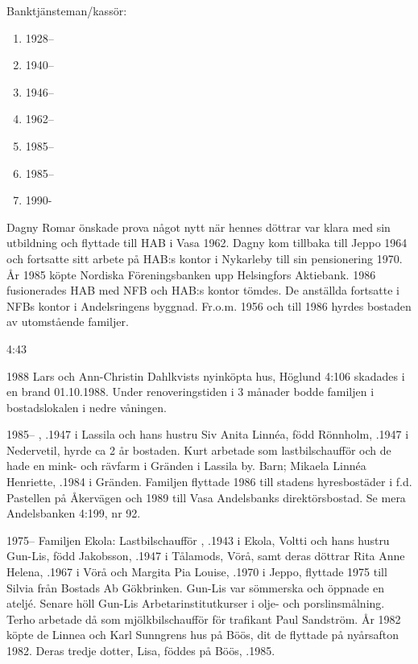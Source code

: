 Banktjänsteman/kassör:
\begin{enumerate}
  \item 1928--  
  \item 1940--  
  \item 1946--	
  \item 1962--  
  \item 1985--  
  \item 1985--	
  \item 1990- 	  
\end{enumerate}

Dagny Romar önskade prova något nytt när hennes döttrar var klara med sin utbildning och flyttade till HAB i Vasa 1962. Dagny kom tillbaka till Jeppo 1964 och fortsatte sitt arbete på HAB:s kontor i Nykarleby till sin pensionering 1970. År 1985 köpte Nordiska Föreningsbanken upp Helsingfors Aktiebank. 1986 fusionerades HAB med NFB och HAB:s kontor tömdes. De anställda fortsatte i NFBs kontor i Andelsringens byggnad. Fr.o.m. 1956 och till 1986 hyrdes bostaden av utomstående familjer.

 4:43

1988
Lars och Ann-Christin Dahlkvists nyinköpta hus, Höglund 4:106 skadades i en brand 01.10.1988. Under renoveringstiden i 3 månader bodde familjen i bostadslokalen i nedre våningen.


1985--
, .1947 i Lassila och hans hustru Siv Anita Linnéa, född Rönnholm, .1947 i Nedervetil, hyrde ca 2 år bostaden. Kurt arbetade som lastbilschaufför och de hade en mink- och rävfarm i Gränden i Lassila by. Barn; Mikaela Linnéa Henriette, .1984 i Gränden. Familjen flyttade 1986 till stadens hyresbostäder i f.d. Pastellen på Åkervägen och 1989 till Vasa Andelsbanks direktörsbostad. Se mera Andelsbanken 4:199, nr 92.


1975--
Familjen Ekola:	Lastbilschaufför , .1943 i Ekola, Voltti och hans hustru Gun-Lis, född Jakobsson, .1947 i Tålamods, Vörå, samt deras döttrar Rita Anne Helena, .1967 i Vörå och Margita Pia Louise, .1970 i Jeppo, flyttade 1975 till Silvia från Bostads Ab	Gökbrinken. Gun-Lis var sömmerska och öppnade en ateljé. Senare höll Gun-Lis Arbetarinstitutkurser i olje- och porslinsmålning. Terho arbetade då som mjölkbilschaufför för trafikant Paul Sandström. År 1982 köpte de Linnea och Karl Sunngrens hus på Böös, dit de flyttade på nyårsafton 1982. Deras tredje dotter, Lisa, föddes på Böös, .1985.


